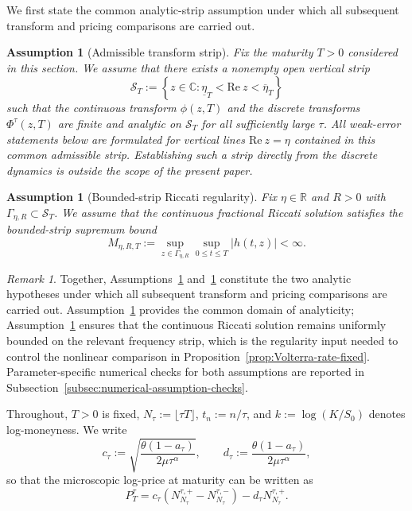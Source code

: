 \documentclass[letterpaper]{article}
\numberwithin{equation}{section}
\newtheorem{assumption}[theorem]{Assumption}
\theoremstyle{definition}
\theoremstyle{remark}
\newtheorem{remark}[theorem]{Remark}
\newcommand{\R}{\mathbb{R}}
\newcommand{\C}{\mathbb{C}}
\begin{document}
We first state the common analytic-strip assumption under which all subsequent transform and pricing comparisons are carried out.

\begin{assumption}[Admissible transform strip]\label{ass:strip}
Fix the maturity $T>0$ considered in this section. We assume that there exists a nonempty open vertical strip
\[
  \mathcal S_T:=\left\{z\in\C:\underline\eta_T<\mathrm{Re}\ z<\overline\eta_T\right\}
\]
such that the continuous transform $\phi(z,T)$ and the discrete transforms $\Phi^\tau(z,T)$ are finite and analytic on $\mathcal S_T$ for all sufficiently large $\tau$. All weak-error statements below are formulated for vertical lines $\mathrm{Re}\ z=\eta$ contained in this common admissible strip. Establishing such a strip directly from the discrete dynamics is outside the scope of the present paper.
\end{assumption}

{
\begin{assumption}[Bounded-strip Riccati regularity]\label{ass:riccati-bound}
Fix $\eta\in\R$ and $R>0$ with $\Gamma_{\eta,R}\subset\mathcal S_T$. We assume that the continuous fractional Riccati solution satisfies the bounded-strip supremum bound
\[
  M_{\eta,R,T}
  :=
  \sup_{z\in\Gamma_{\eta,R}}\sup_{0\le t\le T}|h(t,z)|
  <\infty.
\]
\end{assumption}

\begin{remark}
Together, Assumptions~\ref{ass:strip} and~\ref{ass:riccati-bound} constitute the two analytic hypotheses under which all subsequent transform and pricing comparisons are carried out. Assumption~\ref{ass:strip} provides the common domain of analyticity; Assumption~\ref{ass:riccati-bound} ensures that the continuous Riccati solution remains uniformly bounded on the relevant frequency strip, which is the regularity input needed to control the nonlinear comparison in Proposition~\ref{prop:Volterra-rate-fixed}. Parameter-specific numerical checks for both assumptions are reported in Subsection~\ref{subsec:numerical-assumption-checks}.
\end{remark}
}

Throughout, $T>0$ is fixed, $N_\tau:=\lfloor \tau T\rfloor$, $t_n:=n/\tau$, and $k:=\log(K/S_0)$ denotes log-moneyness. We write
\begin{equation}\label{eq:ctau-dtau-weak}
  c_\tau:=\sqrt{\frac{\theta(1-a_\tau)}{2\mu\tau^\alpha}},
  \qquad
  d_\tau:=\frac{\theta(1-a_\tau)}{2\mu\tau^\alpha},
\end{equation}
so that the microscopic log-price at maturity can be written as
\begin{equation}\label{eq:Ptau-weak}
  P_T^\tau
  =c_\tau\left(N_{N_\tau}^{\tau,+}-N_{N_\tau}^{\tau,-}\right)-d_\tau N_{N_\tau}^{\tau,+}.
\end{equation}
\end{document}
